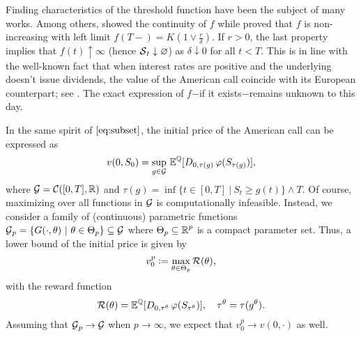  Finding characteristics of the threshold function have been  the subject of many works. Among others, \citet{VB} showed the continuity of $f$ while \citet{Kim} proved that $f$ is non-increasing  with left limit
 $f(T-) = K (1 \vee \frac{r}{\delta})$.  
 If $r>0$,  the last property implies that $f(t) \uparrow \infty$ (hence $\operatorname{\mathcal{S}}_t \downarrow \varnothing$) as $\delta \downarrow 0$ for all $t<T$.  This is in line with the well-known fact that when interest rates are positive and the underlying doesn't issue dividends, the value of the American call coincide with its European counterpart; see \citet{Merton}. The exact expression  of $f$$-$if it exists$-$remains unknown to this day.
 
 In the same spirit of $\eqref{eq:subset}$, the initial price of the American call can be expressed as 
 \begin{equation*}
     v(0,S_0) = \underset{g\in \operatorname{\mathcal{G}}}{\text{sup}} \, \operatorname{\mathbb{E}}^{\operatorname{\mathbb{Q}}}[D_{0,\tau(g)}\, \varphi(S_{\tau(g)})],
 \end{equation*}
 where  $\operatorname{\mathcal{G}} = \operatorname{\mathcal{C}}([0,T], \operatorname{\mathbb{R}})$ and 
 $\tau(g) = \inf\{t\in [0,T] \ | \ S_t \ge g(t) \} \wedge T$. 
 Of course, maximizing over all functions in $\operatorname{\mathcal{G}}$ is computationally infeasible. Instead, we consider a family of (continuous) parametric functions $\operatorname{\mathcal{G}}_{p} = \{ G(\cdot, \theta) \ | \ \theta \in \Theta_p\} \subseteq \operatorname{\mathcal{G}}$ where $\Theta_p \subseteq \operatorname{\mathbb{R}}^p$ is a compact parameter set. 
 Thus,  a lower bound of the initial price is given by
 \begin{equation}\label{eq:paramValue}
     v_0^p := \underset{\theta \in \Theta_p}{\text{max}} \operatorname{\mathcal{R}}(\theta)  ,
 \end{equation} 
 with the reward function
  \begin{equation}\label{eq:reward}
     \operatorname{\mathcal{R}}(\theta) =  \operatorname{\mathbb{E}}^{\operatorname{\mathbb{Q}}}[D_{0,\tau^{\theta}}\, \varphi(S_{\tau^{\theta}})], \quad   \tau^{\theta} = \tau(g^{\theta}).
 \end{equation} 
 Assuming that $\operatorname{\mathcal{G}}_p \to \operatorname{\mathcal{G}}$ when $p \to \infty$, we expect that $v_0^p \to v(0,\cdot)$ as well. 
 

